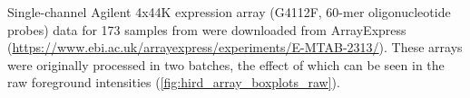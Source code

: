 %
Single-channel Agilent 4x44K expression array (G4112F, 60-mer oligonucleotide probes) data for 173 samples from \textcite{sobolev2016AdjuvantedInfluenzaH1N1Vaccination} were downloaded from ArrayExpress (\url{https://www.ebi.ac.uk/arrayexpress/experiments/E-MTAB-2313/}).
These arrays were originally processed in two batches, the effect of which can be seen in the raw foreground intensities (\cref{fig:hird_array_boxplots_raw}).

